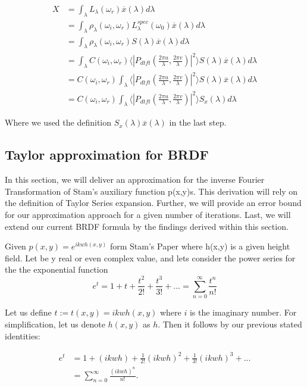 \begin{align}
X 
& =\int_{\lambda}L_\lambda(\omega_r)\overline{x}(\lambda)d\lambda \nonumber \\
& =\int_{\lambda}\rho_\lambda(\omega_i,\omega_r)L_\lambda^{spec}(\omega_0) \overline{x}(\lambda)d\lambda \nonumber \\
& =\int_{\lambda}\rho_\lambda(\omega_i,\omega_r) S(\lambda) \overline{x}(\lambda)d\lambda \nonumber \\
& =\int_{\lambda} C(\omega_i,\omega_r) \langle \left|P_{dtft}(\frac{2\pi u}{\lambda}, \frac{2\pi v}{\lambda})\right|^2\rangle S(\lambda) \overline{x}(\lambda)d\lambda \nonumber \\
& = C(\omega_i,\omega_r) \int_{\lambda} \langle \left|P_{dtft}(\frac{2\pi u}{\lambda}, \frac{2\pi v}{\lambda})\right|^2\rangle S(\lambda) \overline{x}(\lambda)d\lambda \nonumber \\
& = C(\omega_i,\omega_r) \int_{\lambda} \langle \left|P_{dtft}(\frac{2\pi u}{\lambda}, \frac{2\pi v}{\lambda})\right|^2\rangle S_x(\lambda)d\lambda
\end{align}

Where we used the definition $S_x(\lambda)\overline{x}(\lambda)$ in the last step.

\subsection{Taylor approximation for BRDF}
In this section, we will deliver an approximation for the inverse Fourier Transformation of Stam's auxiliary function p(x,y)s. This derivation will rely on the definition of Taylor Series expansion. Further, we will provide an error bound for our approximation approach for a given number of iterations. Last, we will extend our current BRDF formula by the findings derived within this section.

Given $p(x,y)=e^{ikwh(x,y)}$ form Stam's Paper where h(x,y) is a given height field. Let be y real or even complex value, and lets consider the power series for the the exponential function 
\begin{equation*}
  e^{t}=1+t+\frac{t^{2}}{2!}+\frac{t^{3}}{3!}+...=\sum_{n=0}^{\infty}\frac{t^{n}}{n!}
\end{equation*}

Let us define $t := t(x,y) = ikwh(x,y)$ where $i$ is the imaginary number.
For simplification, let us denote $h(x,y)$ as $h$. Then it follows by our previous
stated identities: 

\begin{align*}
 e^{t}
 &=1+(ikwh)+\frac{1}{2!}(ikwh)^{2}+\frac{1}{3!}(ikwh)^{3}+... \\
 &=\sum_{n=0}^{\infty}\frac{(ikwh)^{n}}{n!}.
\end{align*}

